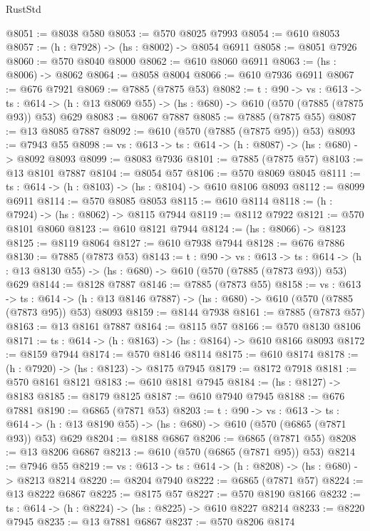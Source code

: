 \begin{lexlean}{RustStd}
\begin{coremodule}
@8051 := @8038 @580
@8053 := @570 @8025 @7993
@8054 := @610 @8053
@8057 := (h : @7928) -> (hs : @8002) -> @8054 @6911
@8058 := @8051 @7926
@8060 := @570 @8040 @8000
@8062 := @610 @8060 @6911
@8063 := (hs : @8006) -> @8062
@8064 := @8058 @8004
@8066 := @610 @7936 @6911
@8067 := @676 @7921
@8069 := @7885 (@7875 @53)
@8082 := {t : @90} ->
  {vs : @613} ->
  {ts : @614} -> (h : @13 @8069 @55) -> (hs : @680) -> @610 (@570 (@7885 (@7875 @93)) @53) @629
@8083 := @8067 @7887
@8085 := @7885 (@7875 @55)
@8087 := @13 @8085 @7887
@8092 := @610 (@570 (@7885 (@7875 @95)) @53)
@8093 := @7943 @55
@8098 := {vs : @613} -> {ts : @614} -> (h : @8087) -> (hs : @680) -> @8092 @8093
@8099 := @8083 @7936
@8101 := @7885 (@7875 @57)
@8103 := @13 @8101 @7887
@8104 := @8054 @57
@8106 := @570 @8069 @8045
@8111 := {ts : @614} -> (h : @8103) -> (hs : @8104) -> @610 @8106 @8093
@8112 := @8099 @6911
@8114 := @570 @8085 @8053
@8115 := @610 @8114
@8118 := (h : @7924) -> (hs : @8062) -> @8115 @7944
@8119 := @8112 @7922
@8121 := @570 @8101 @8060
@8123 := @610 @8121 @7944
@8124 := (hs : @8066) -> @8123
@8125 := @8119 @8064
@8127 := @610 @7938 @7944
@8128 := @676 @7886
@8130 := @7885 (@7873 @53)
@8143 := {t : @90} ->
  {vs : @613} ->
  {ts : @614} -> (h : @13 @8130 @55) -> (hs : @680) -> @610 (@570 (@7885 (@7873 @93)) @53) @629
@8144 := @8128 @7887
@8146 := @7885 (@7873 @55)
@8158 := {vs : @613} ->
  {ts : @614} -> (h : @13 @8146 @7887) -> (hs : @680) -> @610 (@570 (@7885 (@7873 @95)) @53) @8093
@8159 := @8144 @7938
@8161 := @7885 (@7873 @57)
@8163 := @13 @8161 @7887
@8164 := @8115 @57
@8166 := @570 @8130 @8106
@8171 := {ts : @614} -> (h : @8163) -> (hs : @8164) -> @610 @8166 @8093
@8172 := @8159 @7944
@8174 := @570 @8146 @8114
@8175 := @610 @8174
@8178 := (h : @7920) -> (hs : @8123) -> @8175 @7945
@8179 := @8172 @7918
@8181 := @570 @8161 @8121
@8183 := @610 @8181 @7945
@8184 := (hs : @8127) -> @8183
@8185 := @8179 @8125
@8187 := @610 @7940 @7945
@8188 := @676 @7881
@8190 := @6865 (@7871 @53)
@8203 := {t : @90} ->
  {vs : @613} ->
  {ts : @614} -> (h : @13 @8190 @55) -> (hs : @680) -> @610 (@570 (@6865 (@7871 @93)) @53) @629
@8204 := @8188 @6867
@8206 := @6865 (@7871 @55)
@8208 := @13 @8206 @6867
@8213 := @610 (@570 (@6865 (@7871 @95)) @53)
@8214 := @7946 @55
@8219 := {vs : @613} -> {ts : @614} -> (h : @8208) -> (hs : @680) -> @8213 @8214
@8220 := @8204 @7940
@8222 := @6865 (@7871 @57)
@8224 := @13 @8222 @6867
@8225 := @8175 @57
@8227 := @570 @8190 @8166
@8232 := {ts : @614} -> (h : @8224) -> (hs : @8225) -> @610 @8227 @8214
@8233 := @8220 @7945
@8235 := @13 @7881 @6867
@8237 := @570 @8206 @8174

\end{coremodule}
\end{lexlean}
